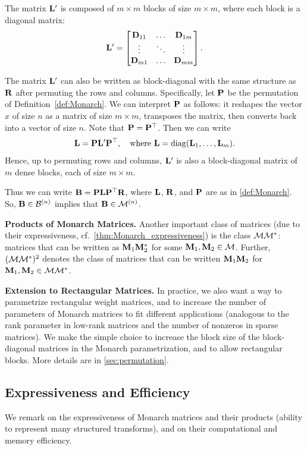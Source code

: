 The matrix $\mathbf{L}'$ is composed of $m \times m$ blocks of size
$m \times m$, where each block is a diagonal matrix:
\begin{equation*}
  \mathbf{L}' =
  \begin{bmatrix}
    \mathbf{D}_{11} & \hdots & \mathbf{D}_{1m} \\
    \vdots & \ddots & \vdots \\
    \mathbf{D}_{m1} & \hdots & \mathbf{D}_{mm} \\
  \end{bmatrix}.
\end{equation*}

The matrix $\mathbf{L}'$ can also be written as block-diagonal with the same structure as $\mathbf{R}$
after permuting the rows and columns.
Specifically, let $\mathbf{P}$ be the permutation of Definition~\ref{def:Monarch}.
We can interpret $\mathbf{P}$ as follows: it reshapes the vector $x$ of size $n$ as a matrix of size
$m \times m$, transposes the matrix, then converts back into a
vector of size $n$. Note that $\mathbf{P} = \mathbf{P}^\top$.
Then we can write
\begin{equation*}
  \mathbf{L} = \mathbf{P} \mathbf{L}' \mathbf{P}^\top, \quad \text{where } \mathbf{L} = \mathrm{diag}(\mathbf{L}_1, \dots, \mathbf{L}_{m}).
\end{equation*}
Hence, up to permuting rows and columns, $\mathbf{L}'$ is also a block-diagonal matrix of
$m$ dense blocks, each of size $m \times m$.

Thus we can write $\mathbf{B} = \mathbf{P} \mathbf{L} \mathbf{P}^\top \mathbf{R}$,
where $\mathbf{L}$, $\mathbf{R}$, and $\mathbf{P}$ are as in \cref{def:Monarch}.
So, $\mathbf{B} \in \mathcal{B}^{(n)}$ implies that $\mathbf{B} \in \mathcal{M}^{(n)}$.

\textbf{Products of Monarch Matrices.}
Another important class of matrices (due to their expressiveness, cf.\ \cref{thm:Monarch_expressiveness})
is the class $\mathcal{M}\mathcal{M}^*$: matrices that can be written as $\mathbf{M}_1\mathbf{M}_2^*$ for some $\mathbf{M}_1, \mathbf{M}_2 \in \mathcal{M}$. Further, $(\mathcal{M}\mathcal{M}^*)^2$ denotes the class of matrices that can be written $\mathbf{M}_1\mathbf{M}_2$ for $\mathbf{M}_1, \mathbf{M}_2 \in \mathcal{M}\mathcal{M}^*$.

\textbf{Extension to Rectangular Matrices.}
In practice, we also want a way to parametrize rectangular weight matrices, and to
increase the number of parameters of Monarch matrices to fit different
applications (analogous to the rank parameter in low-rank matrices and the
number of nonzeros in sparse matrices).
We make the simple choice to increase the block size of the block-diagonal
matrices in the Monarch parametrization, and to allow rectangular blocks. More details are in \cref{sec:permutation}.


\subsection{Expressiveness and Efficiency}
\label{subsec:ee}
We remark on the expressiveness of Monarch matrices and their products (ability
to represent many structured transforms), and on their computational and memory efficiency. 
